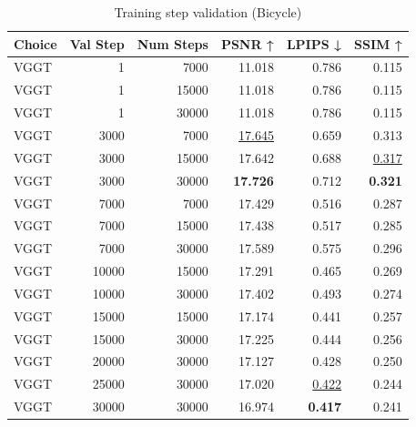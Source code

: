 \begin{table}[H]
\caption{Training step validation (Bicycle)}
\label{tab:99_training_step_validation_bicycle}
\begin{tabular}{lrrrrr}
\toprule
Choice & Val Step & Num Steps & PSNR ↑ & LPIPS ↓ & SSIM ↑ \\
\midrule
VGGT & 1 & 7000 & 11.018 & 0.786 & 0.115 \\
VGGT & 1 & 15000 & 11.018 & 0.786 & 0.115 \\
VGGT & 1 & 30000 & 11.018 & 0.786 & 0.115 \\
VGGT & 3000 & 7000 & \underline{17.645} & 0.659 & 0.313 \\
VGGT & 3000 & 15000 & 17.642 & 0.688 & \underline{0.317} \\
VGGT & 3000 & 30000 & \textbf{17.726} & 0.712 & \textbf{0.321} \\
VGGT & 7000 & 7000 & 17.429 & 0.516 & 0.287 \\
VGGT & 7000 & 15000 & 17.438 & 0.517 & 0.285 \\
VGGT & 7000 & 30000 & 17.589 & 0.575 & 0.296 \\
VGGT & 10000 & 15000 & 17.291 & 0.465 & 0.269 \\
VGGT & 10000 & 30000 & 17.402 & 0.493 & 0.274 \\
VGGT & 15000 & 15000 & 17.174 & 0.441 & 0.257 \\
VGGT & 15000 & 30000 & 17.225 & 0.444 & 0.256 \\
VGGT & 20000 & 30000 & 17.127 & 0.428 & 0.250 \\
VGGT & 25000 & 30000 & 17.020 & \underline{0.422} & 0.244 \\
VGGT & 30000 & 30000 & 16.974 & \textbf{0.417} & 0.241 \\
\bottomrule
\end{tabular}
\end{table}

